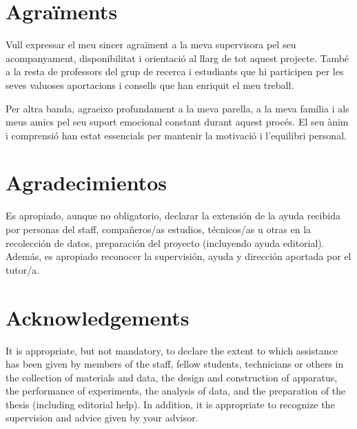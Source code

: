 \clearpage
\ifcase\doclanguage    %
\or
\chapter*{Agraïments}

Vull expressar el meu sincer agraïment a la meva supervisora pel seu acompanyament, disponibilitat i orientació al llarg de tot aquest projecte. També a la resta de professors del grup de recerca i estudiants que hi participen per les seves valuoses aportacions i consells que han enriquit el meu treball.

Per altra banda, agraeixo profundament a la meva parella, a la meva família i als meus amics pel seu suport emocional constant durant aquest procés. El seu ànim i comprensió han estat essencials per mantenir la motivació i l’equilibri personal.
\or
\chapter*{Agradecimientos}

Es apropiado, aunque no obligatorio, declarar la extensión de la ayuda recibida por personas del staff, compañeros/as estudios, técnicos/as u otras en la recolección de datos, preparación del proyecto (incluyendo ayuda editorial). Además, es apropiado reconocer la supervisión, ayuda y dirección aportada por el tutor/a. 
\else
\chapter*{Acknowledgements}

It is appropriate, but not mandatory, to declare the extent to which assistance has been given by members of the staff, fellow students, technicians or others in the collection of materials and data, the design and construction of apparatus, the performance of experiments, the analysis of data, and the preparation of the thesis (including editorial help). In addition, it is appropriate to recognize the supervision and advice given by your advisor.
\fi
